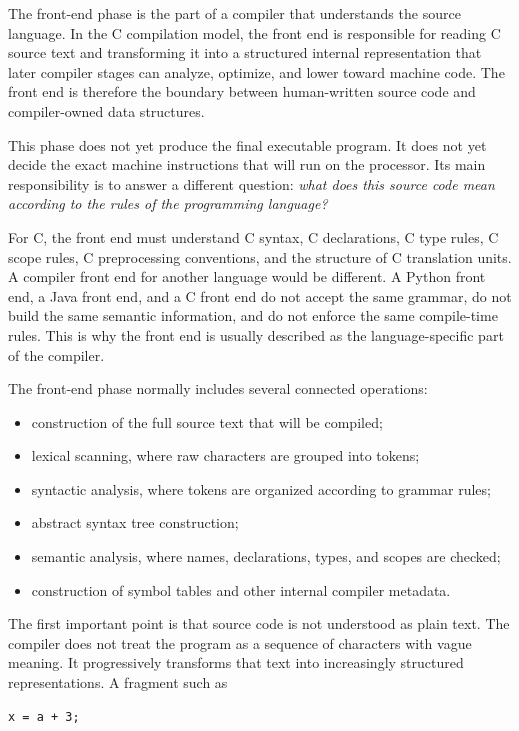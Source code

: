The front-end phase is the part of a compiler that understands the source language. In the C compilation model, the front end is responsible for reading C source text and transforming it into a structured internal representation that later compiler stages can analyze, optimize, and lower toward machine code. The front end is therefore the boundary between human-written source code and compiler-owned data structures.

This phase does not yet produce the final executable program. It does not yet decide the exact machine instructions that will run on the processor. Its main responsibility is to answer a different question: \emph{what does this source code mean according to the rules of the programming language?}

For C, the front end must understand C syntax, C declarations, C type rules, C scope rules, C preprocessing conventions, and the structure of C translation units. A compiler front end for another language would be different. A Python front end, a Java front end, and a C front end do not accept the same grammar, do not build the same semantic information, and do not enforce the same compile-time rules. This is why the front end is usually described as the language-specific part of the compiler.

The front-end phase normally includes several connected operations:

\begin{itemize}
    \item construction of the full source text that will be compiled;
    \item lexical scanning, where raw characters are grouped into tokens;
    \item syntactic analysis, where tokens are organized according to grammar rules;
    \item abstract syntax tree construction;
    \item semantic analysis, where names, declarations, types, and scopes are checked;
    \item construction of symbol tables and other internal compiler metadata.
\end{itemize}

The first important point is that source code is not understood as plain text. The compiler does not treat the program as a sequence of characters with vague meaning. It progressively transforms that text into increasingly structured representations. A fragment such as

\begin{verbatim}
x = a + 3;
\end{verbatim}

